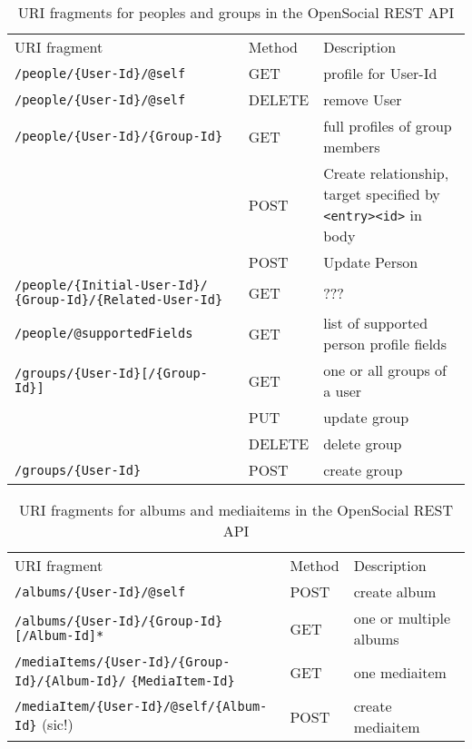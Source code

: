 \documentclass[12pt,a4paper]{scrartcl}		%
\begin{document}
\begin{table}[h]
\begin{tabular}{p{6.5cm} l p{10cm}}
  URI fragment & Method & Description \\
  \verb:/people/{User-Id}/@self: & GET & profile for User-Id \\
  \verb:/people/{User-Id}/@self: & DELETE & remove User \\
  \verb:/people/{User-Id}/{Group-Id}: & GET & full profiles of group members \\
  \verb:: & POST & Create relationship, target specified \newline by \verb:<entry><id>: in body \\
   & POST & Update Person \\
  \verb:/people/{Initial-User-Id}/: \newline \verb:{Group-Id}/{Related-User-Id}: & GET & ??? \\
  \verb:/people/@supportedFields: & GET & list of supported person profile fields \\
  \verb:/groups/{User-Id}[/{Group-Id}]: & GET & one or all groups of a user \\
   & PUT & update group \\
   & DELETE & delete group \\
  \verb:/groups/{User-Id}: & POST & create group \\
\end{tabular}
  \caption{URI fragments for peoples and groups in the OpenSocial REST API}
\end{table}

\begin{table}[h]
\begin{tabular}{p{9.5cm} l p{8cm}}
  URI fragment & Method & Description \\
  \verb:/albums/{User-Id}/@self: & POST & create album \\
  \verb:/albums/{User-Id}/{Group-Id}[/Album-Id]*: & GET & one or multiple albums \\
  \verb:/mediaItems/{User-Id}/{Group-Id}/{Album-Id}/: \newline \verb:{MediaItem-Id}: & GET & one mediaitem \\
  \verb:/mediaItem/{User-Id}/@self/{Album-Id}: (sic!) & POST & create mediaitem \\
\end{tabular}
  \caption{URI fragments for albums and mediaitems in the OpenSocial REST API}
  \label{tab:OSURIAlbums}
\end{table}
\end{document}
